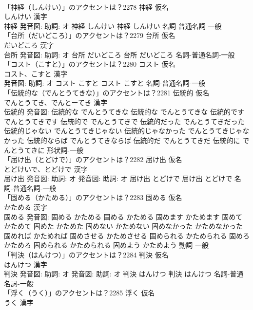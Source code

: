 \documentclass[8pt]{extreport}
\begin{document}
\begin{CJK}{UTF8}{min}
\\	「神経（しんけい）」のアクセントは？2278	神経 仮名　
\\	しんけい 漢字　
\\	神経 発音図: 助詞: オ	神経 しんけい		神経 しんけい				名詞-普通名詞-一般 
\\	「台所（だいどころ）」のアクセントは？2279	台所 仮名　
\\	だいどころ 漢字　
\\	台所 発音図: 助詞: オ	台所 だいどころ		台所 だいどころ				名詞-普通名詞-一般 
\\	「コスト（こすと）」のアクセントは？2280	コスト 仮名　
\\	コスト、こすと 漢字　
\\	発音図: 助詞: オ	コスト こすと		コスト こすと				名詞-普通名詞-一般 
\\	「伝統的な（でんとうてきな）」のアクセントは？2281	伝統的 仮名　
\\	でんとうてき、でんとーてき 漢字　
\\	伝統的 発音図:	伝統的な でんとうてきな		伝統的な でんとうてきな 伝統的です でんとうてきです 伝統的で でんとうてきで 伝統的だった でんとうてきだった 伝統的じゃない でんとうてきじゃない 伝統的じゃなかった でんとうてきじゃなかった 伝統的ならば でんとうてきならば 伝統的だ でんとうてきだ 伝統的に でんとうてきに				形状詞-一般 
\\	「届け出（とどけで）」のアクセントは？2282	届け出 仮名　
\\	とどけいで、とどけで 漢字　
\\	届け出 発音図: 助詞: オ 発音図: 助詞: オ	届け出 とどけで		届け出 とどけで				名詞-普通名詞-一般 
\\	「固める（かためる）」のアクセントは？2283	固める 仮名　
\\	かためる 漢字　
\\	固める 発音図:	固める かためる		固める かためる 固めます かためます 固めて かためて 固めた かためた 固めない かためない 固めなかった かためなかった 固めれば かためれば 固めさせる かためさせる 固められる かためられる 固めろ かためろ 固められる かためられる 固めよう かためよう				動詞-一般 
\\	「判決（はんけつ）」のアクセントは？2284	判決 仮名　
\\	はんけつ 漢字　
\\	判決 発音図: 助詞: オ 発音図: 助詞: オ	判決 はんけつ		判決 はんけつ				名詞-普通名詞-一般 
\\	「浮く（うく）」のアクセントは？2285	浮く 仮名　
\\	うく 漢字　

\end{CJK}
\end{document}
